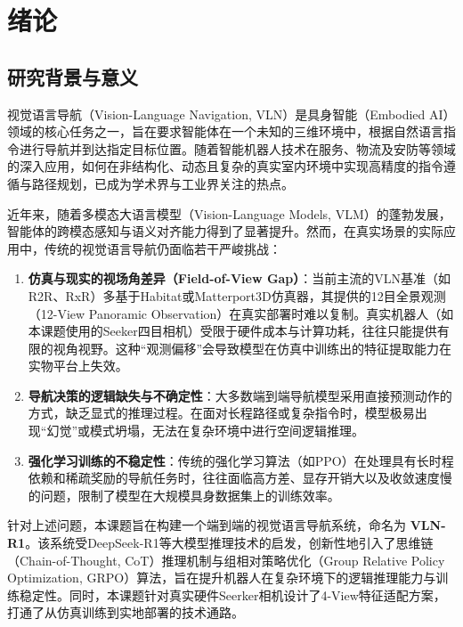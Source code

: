 \cleardoublepage

\section{绪论}

\subsection{研究背景与意义}
视觉语言导航（Vision-Language Navigation, VLN）是具身智能（Embodied AI）领域的核心任务之一，旨在要求智能体在一个未知的三维环境中，根据自然语言指令进行导航并到达指定目标位置。随着智能机器人技术在服务、物流及安防等领域的深入应用，如何在非结构化、动态且复杂的真实室内环境中实现高精度的指令遵循与路径规划，已成为学术界与工业界关注的热点。

近年来，随着多模态大语言模型（Vision-Language Models, VLM）的蓬勃发展，智能体的跨模态感知与语义对齐能力得到了显著提升。然而，在真实场景的实际应用中，传统的视觉语言导航仍面临若干严峻挑战：
\begin{enumerate}
    \item \textbf{仿真与现实的视场角差异（Field-of-View Gap）}：当前主流的VLN基准（如R2R、RxR）多基于Habitat或Matterport3D仿真器，其提供的12目全景观测（12-View Panoramic Observation）在真实部署时难以复制。真实机器人（如本课题使用的Seeker四目相机）受限于硬件成本与计算功耗，往往只能提供有限的视角视野。这种“观测偏移”会导致模型在仿真中训练出的特征提取能力在实物平台上失效。
    \item \textbf{导航决策的逻辑缺失与不确定性}：大多数端到端导航模型采用直接预测动作的方式，缺乏显式的推理过程。在面对长程路径或复杂指令时，模型极易出现“幻觉”或模式坍塌，无法在复杂环境中进行空间逻辑推理。
    \item \textbf{强化学习训练的不稳定性}：传统的强化学习算法（如PPO）在处理具有长时程依赖和稀疏奖励的导航任务时，往往面临高方差、显存开销大以及收敛速度慢的问题，限制了模型在大规模具身数据集上的训练效率。
\end{enumerate}

针对上述问题，本课题旨在构建一个端到端的视觉语言导航系统，命名为 \textbf{VLN-R1}。该系统受DeepSeek-R1等大模型推理技术的启发，创新性地引入了思维链（Chain-of-Thought, CoT）推理机制与组相对策略优化（Group Relative Policy Optimization, GRPO）算法，旨在提升机器人在复杂环境下的逻辑推理能力与训练稳定性。同时，本课题针对真实硬件Seerker相机设计了4-View特征适配方案，打通了从仿真训练到实地部署的技术通路。

